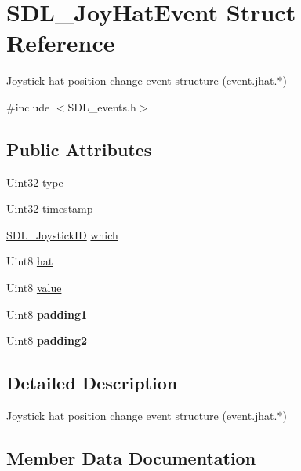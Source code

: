 \hypertarget{structSDL__JoyHatEvent}{}\section{S\+D\+L\+\_\+\+Joy\+Hat\+Event Struct Reference}
\label{structSDL__JoyHatEvent}


Joystick hat position change event structure (event.\+jhat.$\ast$)  




{\ttfamily \#include $<$S\+D\+L\+\_\+events.\+h$>$}

\subsection*{Public Attributes}
\begin{DoxyCompactItemize}
\item 
Uint32 \hyperlink{structSDL__JoyHatEvent_ac583dafab46c44354e210a542aff57cc}{type}
\item 
Uint32 \hyperlink{structSDL__JoyHatEvent_ade58ecb3e75aad4ef9809f040519a021}{timestamp}
\item 
\hyperlink{SDL__joystick_8h_a3c3d32500cb08f76ee8077983912c0bd}{S\+D\+L\+\_\+\+Joystick\+ID} \hyperlink{structSDL__JoyHatEvent_ac9d9bb179f9116d16b3da47cacd74b55}{which}
\item 
Uint8 \hyperlink{structSDL__JoyHatEvent_ab1b54a6d1091e583e856f86b5af1e2f6}{hat}
\item 
Uint8 \hyperlink{structSDL__JoyHatEvent_a52b179a34407449941b61d988ca72ef4}{value}
\item 
\mbox{\label{structSDL__JoyHatEvent_afbe72b6702cf7f70ccbe206737ab2e49}} 
Uint8 {\bfseries padding1}
\item 
\mbox{\label{structSDL__JoyHatEvent_adaca3e99773130ae456690ba83feb420}} 
Uint8 {\bfseries padding2}
\end{DoxyCompactItemize}


\subsection{Detailed Description}
Joystick hat position change event structure (event.\+jhat.$\ast$) 

\subsection{Member Data Documentation}
\mbox{\label{structSDL__JoyHatEvent_ab1b54a6d1091e583e856f86b5af1e2f6}} 
